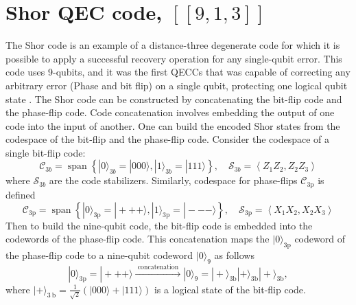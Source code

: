 \section{Shor QEC code, $[[9,1,3]]$}
The Shor code is an example of a distance-three degenerate code for which it is possible to apply a successful recovery operation for any single-qubit error. This code uses 9-qubits, and it was the first QECCs that was capable of correcting any arbitrary error (Phase and bit flip) on a single qubit, protecting one logical qubit state \cite{Shorfirst}.
The Shor code can be constructed by concatenating the bit-flip code and the phase-flip code. 
Code concatenation involves embedding the output of one code into the input of another.
One can build the encoded Shor states from the codespace of the bit-flip and the phase-flip code. 
Consider the codespace of a single bit-flip code: 
$$
\mathcal{C}_{3b}=\operatorname{span}\left\{|0\rangle_{3b}=|000\rangle,|1\rangle_{3 b}=|111\rangle\right\}, \quad \mathcal{S}_{3 b}=\left\langle Z_{1} Z_{2}, Z_{2} Z_{3}\right\rangle
$$
where $\mathcal{S}_{3b}$ are the code stabilizers. Similarly, codespace for phase-flips $\mathcal{C}_{3 \mathrm{p}}$ is defined
$$
\mathcal{C}_{3 \mathrm{p}}=\operatorname{span}\left\{|0\rangle_{3 \mathrm{p}}=|+++\rangle,|1\rangle_{3 \mathrm{p}}=|---\rangle\right\}, \quad \mathcal{S}_{3 \mathrm{p}}=\left\langle X_{1} X_{2}, X_{2} X_{3}\right\rangle
$$
Then to build the nine-qubit code, the bit-flip code is embedded into the codewords of the phase-flip code. This concatenation maps the $|0\rangle_{3 \mathrm{p}}$ codeword of the phase-flip code to a nine-qubit codeword $|0\rangle_{9}$ as follows
$$
|0\rangle_{3 \mathrm{p}}=|+++\rangle \stackrel{\text { concatenation }}{\longrightarrow}|0\rangle_{9}=|+\rangle_{3 \mathrm{b}}|+\rangle_{3 \mathrm{b}}|+\rangle_{3 \mathrm{b}},
$$
where $|+\rangle_{3 \mathrm{~b}}=\frac{1}{\sqrt{2}}(|000\rangle+|111\rangle)$ is a logical state of the bit-flip code. 

